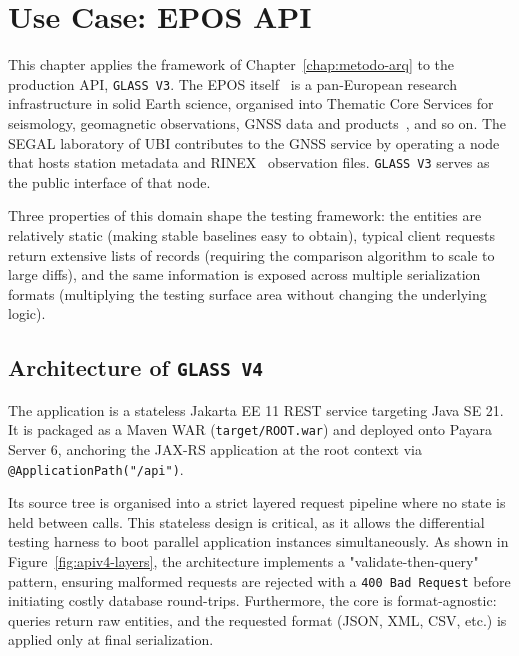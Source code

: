 \chapter{Use Case: EPOS API}
\label{chap:caso-epos}

This chapter applies the framework of Chapter~\ref{chap:metodo-arq} to the
production \ac{API}, \texttt{GLASS V3}. The \ac{EPOS} itself~\cite{fernandes2022new}
is a pan-European research infrastructure in solid Earth science, organised
into Thematic Core Services for seismology, geomagnetic observations, \ac{GNSS}
data and products~\cite{eposGnss}, and so on. The \ac{SEGAL} laboratory of
\ac{UBI} contributes to the \ac{GNSS} service by operating a node that
hosts station metadata and \ac{RINEX}~\cite{rinex} observation files.
\texttt{GLASS V3} serves as the public interface of that node.

Three properties of this domain shape the testing framework: the entities
are relatively static (making stable baselines easy to obtain), typical client
requests return extensive lists of records (requiring the comparison
algorithm to scale to large diffs), and the same information is exposed
across multiple serialization formats (multiplying the testing surface area without
changing the underlying logic).

\section{Architecture of \texttt{GLASS V4}}
\label{sec:apiv4-arch}

The application is a stateless Jakarta EE 11 \ac{REST} service targeting
Java SE 21. It is packaged as a Maven \ac{WAR} (\texttt{target/ROOT.war})
and deployed onto Payara Server 6, anchoring the \ac{JAX-RS} application at
the root context via \texttt{@ApplicationPath("/api")}.

Its source tree is organised into a strict layered request pipeline where no
state is held between calls. This stateless design is critical, as it allows
the differential testing harness to boot parallel application instances simultaneously.
As shown in Figure~\ref{fig:apiv4-layers}, the architecture implements a "validate-then-query"
pattern, ensuring malformed requests are rejected with a \texttt{400 Bad
Request} before initiating costly database round-trips. Furthermore, the core
is format-agnostic: queries return raw entities, and the requested format (\ac{JSON},
\ac{XML}, \ac{CSV}, etc.) is applied only at final serialization.


